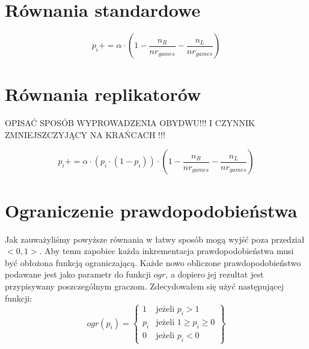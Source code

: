 \section{Równania standardowe}
\label{sec:r_stand}

\begin{equation} \label{eq:stand}
p_i += \alpha \cdot (1 - \frac{n_R}{nr_{games}} - \frac{n_L}{nr_{games}})
\end{equation}

\section{Równania replikatorów}
\label{sec:r_repli}

OPISAĆ SPOSÓB WYPROWADZENIA OBYDWU!!! I CZYNNIK ZMNIEJSZCZYJĄCY NA KRAŃCACH !!!

\begin{equation} \label{eq:repli}
p_i += \alpha \cdot (p_i \cdot (1 - p_i)) \cdot (1 - \frac{n_R}{nr_{games}} - \frac{n_L}{nr_{games}})
\end{equation}

\section{Ograniczenie prawdopodobieństwa}
\label{sec:ograniczenie}
Jak zauważyliśmy powyższe równania w łatwy sposób mogą wyjść poza przedział $<0,1>$. Aby temu zapobiec każda inkrementacja prawdopodobieństwa musi być obłożona funkcją ograniczającą. Każde nowo obliczone prawdopodobieństwo podawane jest jako parametr do funkcji $ogr$, a dopiero jej rezultat jest przypisywany poszczególnym graczom. Zdecydowałem się użyć następującej funkcji:
\begin{displaymath}
ogr(p_i) = \left\{
\begin{array}{ll}
1 & \text{jeżeli } p_i > 1 \\
p_i & \text{jeżeli } 1 \geq p_i \geq 0 \\
0 & \text{jeżeli } p_i < 0
\end{array} 
\right\}
\end{displaymath}

